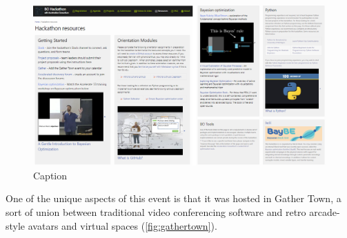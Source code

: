 \documentclass[superscriptaddress, nofootinbib,  amsmath, amssymb, twocolumn]{revtex4-2}
\begin{document}
\begin{figure}
    \centering
    \includegraphics[width=1\linewidth]{latex/figures/preparation.png}
    \caption{Caption}
    \label{fig:preparation}
\end{figure}

One of the unique aspects of this event is that it was hosted in Gather Town, a sort of union between traditional video conferencing software and retro arcade-style avatars and virtual spaces (\cref{fig:gathertown}).




\end{document}

